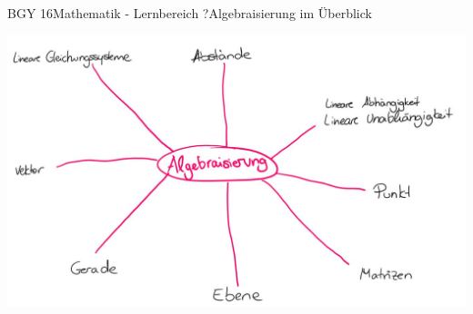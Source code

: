 \documentclass[oneside,openany,headings=optiontotoc,11pt,numbers=noenddot]{scrreprt}
\begin{document}
	\begin{worksheet}{BGY 16}{Mathematik - Lernbereich ?}{Algebraisierung im Überblick}
		
		\noindent
		\begin{landscape}
			\begin{framed}
				\includegraphics[width=\textwidth]{Algebraisierung.jpg}
				
			\end{framed}
		\end{landscape}
		
	\end{worksheet}
\end{document}
